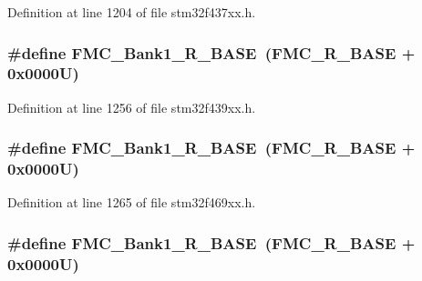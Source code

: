 Definition at line 1204 of file stm32f437xx.\+h.

\subsubsection[{\texorpdfstring{F\+M\+C\+\_\+\+Bank1\+\_\+\+R\+\_\+\+B\+A\+SE}{FMC_Bank1_R_BASE}}]{\setlength{\rightskip}{0pt plus 5cm}\#define F\+M\+C\+\_\+\+Bank1\+\_\+\+R\+\_\+\+B\+A\+SE~({\bf F\+M\+C\+\_\+\+R\+\_\+\+B\+A\+SE} + 0x0000\+U)}\hypertarget{group___peripheral__memory__map_ga1d581e6f64ed2e5d97c11c58285a21b6}{}\label{group___peripheral__memory__map_ga1d581e6f64ed2e5d97c11c58285a21b6}


Definition at line 1256 of file stm32f439xx.\+h.

\subsubsection[{\texorpdfstring{F\+M\+C\+\_\+\+Bank1\+\_\+\+R\+\_\+\+B\+A\+SE}{FMC_Bank1_R_BASE}}]{\setlength{\rightskip}{0pt plus 5cm}\#define F\+M\+C\+\_\+\+Bank1\+\_\+\+R\+\_\+\+B\+A\+SE~({\bf F\+M\+C\+\_\+\+R\+\_\+\+B\+A\+SE} + 0x0000\+U)}\hypertarget{group___peripheral__memory__map_ga1d581e6f64ed2e5d97c11c58285a21b6}{}\label{group___peripheral__memory__map_ga1d581e6f64ed2e5d97c11c58285a21b6}


Definition at line 1265 of file stm32f469xx.\+h.

\subsubsection[{\texorpdfstring{F\+M\+C\+\_\+\+Bank1\+\_\+\+R\+\_\+\+B\+A\+SE}{FMC_Bank1_R_BASE}}]{\setlength{\rightskip}{0pt plus 5cm}\#define F\+M\+C\+\_\+\+Bank1\+\_\+\+R\+\_\+\+B\+A\+SE~({\bf F\+M\+C\+\_\+\+R\+\_\+\+B\+A\+SE} + 0x0000\+U)}\hypertarget{group___peripheral__memory__map_ga1d581e6f64ed2e5d97c11c58285a21b6}{}\label{group___peripheral__memory__map_ga1d581e6f64ed2e5d97c11c58285a21b6}


